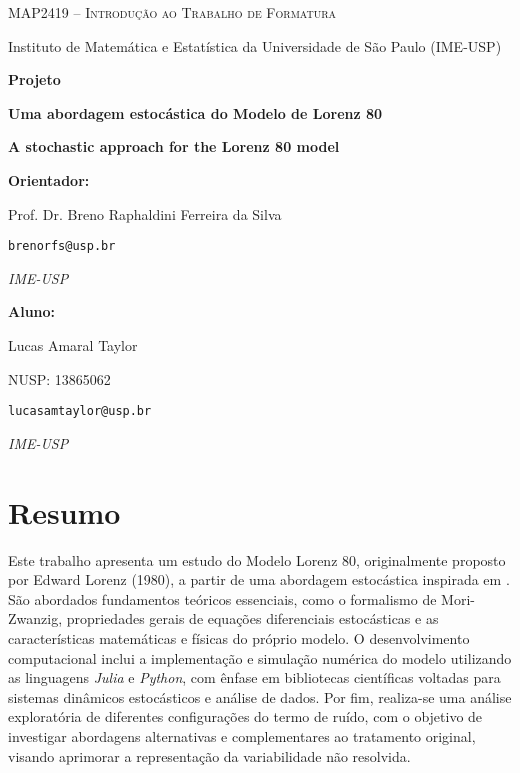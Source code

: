 \documentclass[12pt]{article}
\newenvironment{resumo}{
  \fontsize{10pt}{12pt}\selectfont  %
  \setstretch{1}                    %
  \par\noindent                     %
  \justifying                      %
}{
  \par
}
\begin{document}
\begin{titlepage}
	\centering
	{\Large\scshape MAP2419 -- Introdução ao Trabalho de Formatura \par}
	\vspace{0.3cm}
	{\large Instituto de Matemática e Estatística da Universidade de São Paulo (IME-USP)\par}
	    
	\vspace{3cm}
	    
	{\LARGE\bfseries Projeto\par}
	\vspace{1cm}
	{\LARGE\bfseries Uma abordagem estocástica do Modelo de Lorenz 80\par}
	\vspace{0.5em}
	{\large\bfseries A stochastic approach for the Lorenz 80 model\par}
	
	\vfill
	    
	\begin{minipage}[t]{0.45\textwidth}
		\raggedright
		\textbf{Orientador:} \par
		Prof. Dr. Breno Raphaldini Ferreira da Silva  \par
		\texttt{brenorfs@usp.br} \par
		\textit{IME-USP} \par\medskip
	\end{minipage}
	\hfill
	\begin{minipage}[t]{0.45\textwidth}
		\raggedright
		\textbf{Aluno:} \par
		Lucas Amaral Taylor \par
		NUSP: 13865062 \par
		\texttt{lucasamtaylor@usp.br} \par
		\textit{IME-USP}
	\end{minipage}
	\vspace{2cm}
\end{titlepage}

\newpage
\section*{Resumo}
\begin{resumo}
    Este trabalho apresenta um estudo do Modelo Lorenz 80, originalmente proposto por Edward Lorenz (1980), a partir de uma abordagem estocástica inspirada em \citet{Chekroun2021}. São abordados fundamentos teóricos essenciais, como o formalismo de Mori-Zwanzig, propriedades gerais de equações diferenciais estocásticas e as características matemáticas e físicas do próprio modelo. O desenvolvimento computacional inclui a implementação e simulação numérica do modelo utilizando as linguagens \textit{Julia} e \textit{Python}, com ênfase em bibliotecas científicas voltadas para sistemas dinâmicos estocásticos e análise de dados. Por fim, realiza-se uma análise exploratória de diferentes configurações do termo de ruído, com o objetivo de investigar abordagens alternativas e complementares ao tratamento original, visando aprimorar a representação da variabilidade não resolvida.
\end{resumo}
\end{document}
